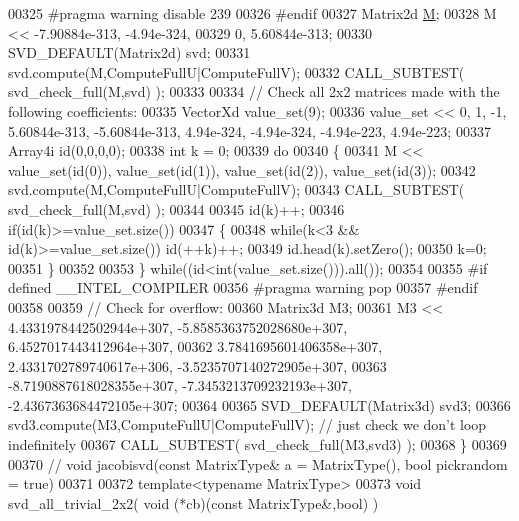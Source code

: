 \begin{DoxyCode}
00325 \textcolor{preprocessor}{#pragma warning disable 239}
00326 \textcolor{preprocessor}{#endif}
00327   Matrix2d \hyperlink{group___core___module_class_eigen_1_1_matrix}{M};
00328   M << -7.90884e-313, -4.94e-324,
00329                  0, 5.60844e-313;
00330   SVD\_DEFAULT(Matrix2d) svd;
00331   svd.compute(M,ComputeFullU|ComputeFullV);
00332   CALL\_SUBTEST( svd\_check\_full(M,svd) );
00333   
00334   \textcolor{comment}{// Check all 2x2 matrices made with the following coefficients:}
00335   VectorXd value\_set(9);
00336   value\_set << 0, 1, -1, 5.60844e-313, -5.60844e-313, 4.94e-324, -4.94e-324, -4.94e-223, 4.94e-223;
00337   Array4i id(0,0,0,0);
00338   \textcolor{keywordtype}{int} k = 0;
00339   \textcolor{keywordflow}{do}
00340   \{
00341     M << value\_set(\textcolor{keywordtype}{id}(0)), value\_set(\textcolor{keywordtype}{id}(1)), value\_set(\textcolor{keywordtype}{id}(2)), value\_set(\textcolor{keywordtype}{id}(3));
00342     svd.compute(M,ComputeFullU|ComputeFullV);
00343     CALL\_SUBTEST( svd\_check\_full(M,svd) );
00344 
00345     id(k)++;
00346     \textcolor{keywordflow}{if}(\textcolor{keywordtype}{id}(k)>=value\_set.size())
00347     \{
00348       \textcolor{keywordflow}{while}(k<3 && \textcolor{keywordtype}{id}(k)>=value\_set.size()) \textcolor{keywordtype}{id}(++k)++;
00349       \textcolor{keywordtype}{id}.head(k).setZero();
00350       k=0;
00351     \}
00352 
00353   \} \textcolor{keywordflow}{while}((\textcolor{keywordtype}{id}<\textcolor{keywordtype}{int}(value\_set.size())).all());
00354   
00355 \textcolor{preprocessor}{#if defined \_\_INTEL\_COMPILER}
00356 \textcolor{preprocessor}{#pragma warning pop}
00357 \textcolor{preprocessor}{#endif}
00358   
00359   \textcolor{comment}{// Check for overflow:}
00360   Matrix3d M3;
00361   M3 << 4.4331978442502944e+307, -5.8585363752028680e+307,  6.4527017443412964e+307,
00362         3.7841695601406358e+307,  2.4331702789740617e+306, -3.5235707140272905e+307,
00363        -8.7190887618028355e+307, -7.3453213709232193e+307, -2.4367363684472105e+307;
00364 
00365   SVD\_DEFAULT(Matrix3d) svd3;
00366   svd3.compute(M3,ComputeFullU|ComputeFullV); \textcolor{comment}{// just check we don't loop indefinitely}
00367   CALL\_SUBTEST( svd\_check\_full(M3,svd3) );
00368 \}
00369 
00370 \textcolor{comment}{// void jacobisvd(const MatrixType& a = MatrixType(), bool pickrandom = true)}
00371 
00372 \textcolor{keyword}{template}<\textcolor{keyword}{typename} MatrixType>
00373 \textcolor{keywordtype}{void} svd\_all\_trivial\_2x2( \textcolor{keywordtype}{void} (*cb)(\textcolor{keyword}{const} MatrixType&,\textcolor{keywordtype}{bool}) )

\end{DoxyCode}
